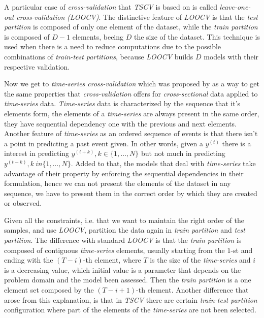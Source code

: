 A particular case of \textit{cross-validation} that \textit{TSCV} is
based on is called \textit{leave-one-out cross-validation (LOOCV)}.
The distinctive feature of \textit{LOOCV} is that the \textit{test
partition} is composed of only one element of the dataset, while the
\textit{train partition} is composed of $D - 1$ elements, beeing $D$
the size of the dataset. This technique is used when there is a need
to reduce computations due to the possible combinations of
\textit{train-test partitions}, because \textit{LOOCV} builds $D$
models with their respective validation.

Now we get to \textit{time-series cross-validation} which was proposed
by \cite{hart1994automated} as a way to get the same properties that
\textit{cross-validation} offers for \textit{cross-sectional} data
applied to \textit{time-series} data. \textit{Time-series} data is
characterized by the sequence that it's elements form, the elements of
a \textit{time-series} are always present in the same order, they have
sequential dependency one with the previous and next elements. Another
feature of \textit{time-series} as an ordered sequence of events is
that there isn't a point in predicting a past event given. In other
words, given a $y^{(t)}$ there is a interest in predicting $y^{(t+k)},
k \in \{1,\dots,N\}$ but not much in predicting $y^{(t-k)}, k \ in
\{1, \dots, N\}$. Added to that, the models that deal with
\textit{time-series} take advantage of their property by enforcing the
sequential dependencies in their formulation, hence we can not present
the elements of the dataset in any sequence, we have to present them
in the correct order by which they are created or observed.

Given all the constraints, i.e. that we want to maintain the right
order of the samples, and use \textit{LOOCV}, partition the data again
in \textit{train partition} and \textit{test partition}. The
difference with standard \textit{LOOCV} is that the \textit{train
partition} is composed of contiguous \textit{time-series} elements,
usually starting from the $1$-st and ending with the $(T - i)$-th
element, where $T$ is the size of the \textit{time-series} and $i$ is
a decreasing value, which initial value is a parameter that depends on
the problem domain and the model been assessed. Then the \textit{train
partition} is a one element set composed by the $(T - i + 1)$-th
element. Another difference that arose from this explanation, is that
in \textit{TSCV} there are certain \textit{train-test partition}
configuration where part of the elements of the \textit{time-series}
are not been selected.

